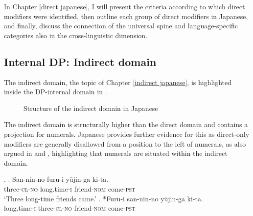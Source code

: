 In Chapter \ref{direct japanese}, I will present the criteria according to which direct modifiers were identified, then outline each group of direct modifiers in Japanese, and finally, discuss the connection of the universal spine and language-specific categories also in the cross-linguistic dimension.


\subsection{Internal DP: Indirect domain}

The indirect domain, the topic of Chapter \ref{indirect japanese}, is highlighted inside the DP-internal domain in .

\begin{figure}



 \caption{Structure of the indirect domain in Japanese}
 \label{fig:Structure of the Indirect Domain in Japanese1}
\end{figure}


The indirect domain is structurally higher than the direct domain and contains a projection for numerals. Japanese provides further evidence for this as direct-only modifiers are generally disallowed from a position to the left of numerals, as also argued in \citet{ayano:2010:revisiting} and \citet{watanabe:2017:attributive}, highlighting that numerals are situated within the indirect domain.

\ex. \ag. San-nin-no furu-i yūjin-ga ki-ta.\\
three-\textsc{cl-no} long.time-\textsc{i} friend-\textsc{nom} come-\textsc{pst}\\
`Three long-time friends came.' \hfill \citep[106]{ayano:2010:revisiting}
\bg. *Furu-i san-nin-no yūjin-ga ki-ta.\\
long.time-\textsc{i} three-\textsc{cl-no} friend-\textsc{nom} come-\textsc{pst}\\


